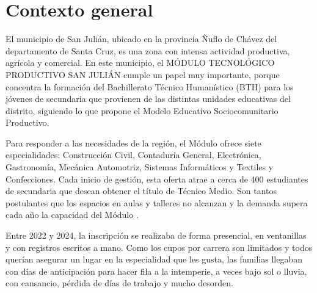 \section{Contexto general}
\label{sec:contexto_general}

El municipio de San Julián, ubicado en la provincia Ñuflo de Chávez del departamento de Santa Cruz, es una zona con intensa actividad productiva, agrícola y comercial. En este municipio, el MÓDULO TECNOLÓGICO PRODUCTIVO SAN JULIÁN cumple un papel muy importante, porque concentra la formación del Bachillerato Técnico Humanístico (BTH) para los jóvenes de secundaria que provienen de las distintas unidades educativas del distrito, siguiendo lo que propone el Modelo Educativo Sociocomunitario Productivo.

Para responder a las necesidades de la región, el Módulo ofrece siete especialidades: Construcción Civil, Contaduría General, Electrónica, Gastronomía, Mecánica Automotriz, Sistemas Informáticos y Textiles y Confecciones. Cada inicio de gestión, esta oferta atrae a cerca de 400 estudiantes de secundaria que desean obtener el título de Técnico Medio. Son tantos postulantes que los espacios en aulas y talleres no alcanzan y la demanda supera cada año la capacidad del Módulo \parencite{ministerioeducacion2023}.

Entre 2022 y 2024, la inscripción se realizaba de forma presencial, en ventanillas y con registros escritos a mano. Como los cupos por carrera son limitados y todos querían asegurar un lugar en la especialidad que les gusta, las familias llegaban con días de anticipación para hacer fila a la intemperie, a veces bajo sol o lluvia, con cansancio, pérdida de días de trabajo y mucho desorden.
